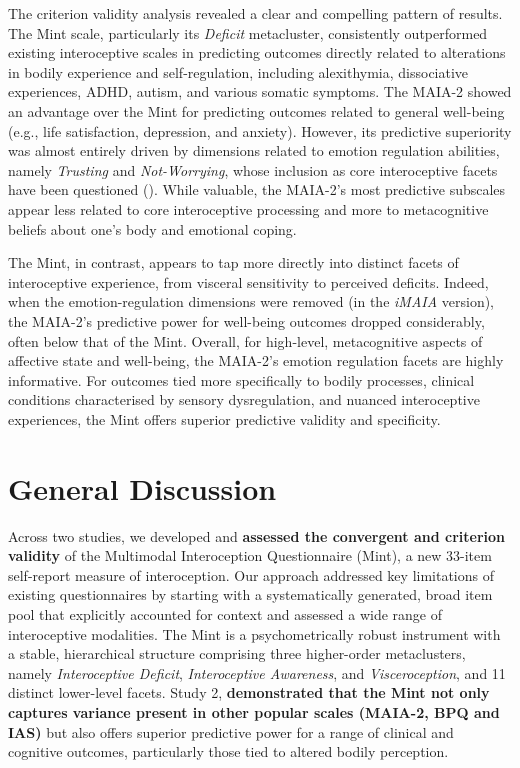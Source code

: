 \documentclass[
  man,
  floatsintext,
  longtable,
  nolmodern,
  notxfonts,
  notimes,
  mask,
  colorlinks=true,linkcolor=blue,citecolor=blue,urlcolor=blue]{apa7}
\begin{document}
The criterion validity analysis revealed a clear and compelling pattern
of results. The Mint scale, particularly its \emph{Deficit} metacluster,
consistently outperformed existing interoceptive scales in predicting
outcomes directly related to alterations in bodily experience and
self-regulation, including alexithymia, dissociative experiences, ADHD,
autism, and various somatic symptoms. The MAIA-2 showed an advantage
over the Mint for predicting outcomes related to general well-being
(e.g., life satisfaction, depression, and anxiety). However, its
predictive superiority was almost entirely driven by dimensions related
to emotion regulation abilities, namely \emph{Trusting} and
\emph{Not-Worrying}, whose inclusion as core interoceptive facets have
been questioned (). While valuable, the MAIA-2's most predictive subscales appear
less related to core interoceptive processing and more to metacognitive
beliefs about one's body and emotional coping.

The Mint, in contrast, appears to tap more directly into distinct facets
of interoceptive experience, from visceral sensitivity to perceived
deficits. Indeed, when the emotion-regulation dimensions were removed
(in the \emph{iMAIA} version), the MAIA-2's predictive power for
well-being outcomes dropped considerably, often below that of the Mint.
Overall, for high-level, metacognitive aspects of affective state and
well-being, the MAIA-2's emotion regulation facets are highly
informative. For outcomes tied more specifically to bodily processes,
clinical conditions characterised by sensory dysregulation, and nuanced
interoceptive experiences, the Mint offers superior predictive validity
and specificity.

\section{General Discussion}\label{general-discussion}

Across two studies, we developed and \textbf{assessed the convergent and
criterion validity} of the Multimodal Interoception Questionnaire
(Mint), a new 33-item self-report measure of interoception. Our approach
addressed key limitations of existing questionnaires by starting with a
systematically generated, broad item pool that explicitly accounted for
context and assessed a wide range of interoceptive modalities. The Mint
is a psychometrically robust instrument with a stable, hierarchical
structure comprising three higher-order metaclusters, namely
\emph{Interoceptive Deficit}, \emph{Interoceptive Awareness}, and
\emph{Visceroception}, and 11 distinct lower-level facets. Study 2,
\textbf{demonstrated that the Mint not only captures variance present in
other popular scales (MAIA-2, BPQ and IAS)} but also offers superior
predictive power for a range of clinical and cognitive outcomes,
particularly those tied to altered bodily perception.
\end{document}
